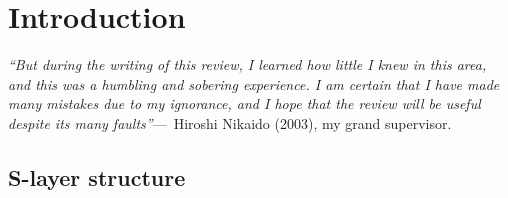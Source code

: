\acresetall

\chapter{Introduction}
\label{ch:Introduction}

    \begin{epigraph}
            \emph{``But during the writing of this review, I learned how little I knew in this area, and this was a humbling and sobering experience. I am certain that I have made many mistakes due to my ignorance, and I hope that the review will be useful despite its many faults''}---~Hiroshi Nikaido (2003), my grand supervisor.
    \end{epigraph}

    \section{S-layer structure} %
    \label{sec:s_layer_structure}


